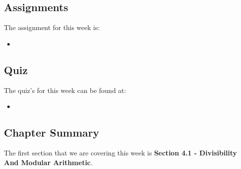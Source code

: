 \subsection{Assignments}

The assignment for this week is:

\begin{itemize}
    \item {}
\end{itemize}

\subsection{Quiz}

The quiz's for this week can be found at:

\begin{itemize}
    \item {}
\end{itemize}

\subsection{Chapter Summary}

The first section that we are covering this week is \textbf{Section 4.1 - Divisibility And Modular Arithmetic}. 

